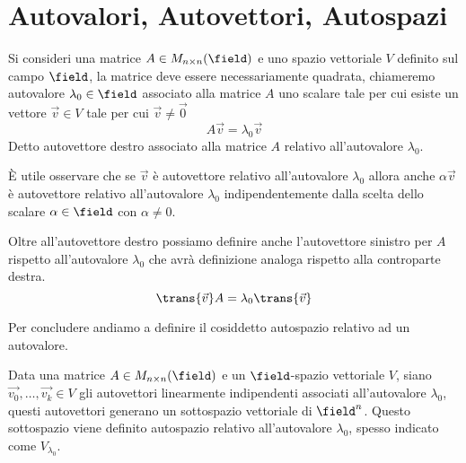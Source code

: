 \section{Autovalori, Autovettori, Autospazi}
Si consideri una matrice $A \in M_{n \times n}(\field)$ e uno spazio vettoriale $V$ definito sul campo $\field$, la matrice deve essere necessariamente quadrata, chiameremo autovalore $\lambda_0 \in \field$ associato alla matrice $A$ uno scalare tale per cui esiste un vettore $\vec{v} \in V$ tale per cui $\vec{v} \neq \vec{0}$
\begin{equation}
	A\vec{v} = \lambda_0\vec{v}
\end{equation}
Detto autovettore destro associato alla matrice $A$ relativo all'autovalore $\lambda_0$.

È utile osservare che se $\vec{v}$ è autovettore relativo all'autovalore $\lambda_0$ allora anche $\alpha\vec{v}$ è autovettore relativo all'autovalore $\lambda_0$ indipendentemente dalla scelta dello scalare $\alpha \in \field$ con $\alpha \neq 0$.

Oltre all'autovettore destro possiamo definire anche l'autovettore sinistro per $A$ rispetto all'autovalore $\lambda_0$ che avrà definizione analoga rispetto alla controparte destra.
\begin{equation}
	\trans{\vec{v}}A = \lambda_0\trans{\vec{v}}
\end{equation}

Per concludere andiamo a definire il cosiddetto autospazio relativo ad un autovalore.
\begin{definition}
	Data una matrice $A \in M_{n \times n}(\field)$ e un $\field$-spazio vettoriale $V$, siano $\vec{v_0}, \dots, \vec{v_k} \in V$ gli autovettori linearmente indipendenti associati all'autovalore $\lambda_0$, questi autovettori generano un sottospazio vettoriale di $\field^n$. Questo sottospazio viene definito autospazio relativo all'autovalore $\lambda_0$, spesso indicato come $V_{\lambda_0}$.
\end{definition}
